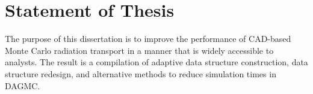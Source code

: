 \section{Statement of Thesis}

The purpose of this dissertation is to improve the performance of CAD-based
Monte Carlo radiation transport in a manner that is widely accessible to
analysts. The result is a compilation of adaptive data structure construction,
data structure redesign, and alternative methods to reduce simulation times in
DAGMC.
